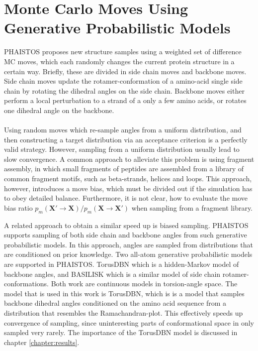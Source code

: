 \section{Monte Carlo Moves Using Generative Probabilistic Models}
\label{chap:generative}
PHAISTOS proposes new structure samples using a weighted set of difference MC moves, which each randomly changes the current protein structure in a certain way. Briefly, these are divided in side chain moves and backbone moves.
Side chain moves update the rotamer-conformation of a amino-acid single side chain by rotating the dihedral angles on the side chain.
Backbone moves either perform a local perturbation to a strand of a only a few amino acids, or rotates one dihedral angle on the backbone.
\\\\Using random moves which re-sample angles from a uniform distribution, and then constructing a target distribution via an acceptance criterion is a perfectly valid strategy.
However, sampling from a uniform distribution usually lead to slow convergence.
A common approach to alleviate this problem is using fragment assembly, in which small fragments of peptides are assembled from a library of common fragment motifs, such as beta-strands, helices and loops.
This approach, however, introduces a move bias, which must be divided out if the simulation has to obey detailed balance.
Furthermore, it is not clear, how to evaluate the move bias ratio $p_m(\mathbf{X'} \rightarrow \mathbf{X}) / p_m(\mathbf{X} \rightarrow \mathbf{X'})$ when sampling from a fragment library.

A related approach to obtain a similar speed up is biased sampling.
PHAISTOS supports sampling of both side chain and backbone angles from such generative probabilistic models.
In this approach, angles are sampled from distributions that are conditioned on prior knowledge.
Two all-atom generative probabilistic models are supported in PHAISTOS.
TorusDBN which is a hidden-Markov model of backbone angles\cite{Torus08}, and BASILISK\cite{BASILISK} which is a similar model of side chain rotamer-conformations.
Both work are continuous models in torsion-angle space.
The model that is used in this work is TorusDBN, which is is a model that samples backbone dihedral angles conditioned on the amino acid sequence from a distribution that resembles the Ramachandran-plot.
This effectively speeds up convergence of sampling, since uninteresting parts of conformational space in only sampled very rarely.
The importance of the TorusDBN model is discussed in chapter \ref{chapter:results}.

